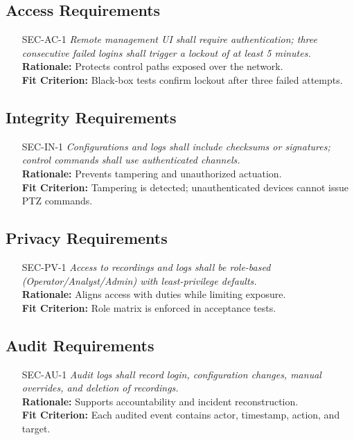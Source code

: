 \documentclass[12pt]{article}
\begin{document}
\subsection{Access Requirements}
\begin{itemize}[leftmargin=*]
  \item[SEC-AC-1] \emph{Remote management UI shall require authentication; three
          consecutive failed logins shall trigger a lockout of at least 5 minutes.}\\
        \textbf{Rationale:} Protects control paths exposed over the network.\\
        \textbf{Fit Criterion:} Black-box tests confirm lockout after three failed
        attempts.
\end{itemize}

\subsection{Integrity Requirements}
\begin{itemize}[leftmargin=*]
  \item[SEC-IN-1] \emph{Configurations and logs shall include checksums or signatures;
          control commands shall use authenticated channels.}\\ \textbf{Rationale:}
        Prevents tampering and unauthorized actuation.\\ \textbf{Fit Criterion:}
        Tampering is detected; unauthenticated devices cannot issue PTZ commands.
\end{itemize}

\subsection{Privacy Requirements}
\begin{itemize}[leftmargin=*]
  \item[SEC-PV-1] \emph{Access to recordings and logs shall be role-based
          (Operator/Analyst/Admin) with least-privilege defaults.}\\ \textbf{Rationale:}
        Aligns access with duties while limiting exposure.\\ \textbf{Fit Criterion:}
        Role matrix is enforced in acceptance tests.
\end{itemize}

\subsection{Audit Requirements}
\begin{itemize}[leftmargin=*]
  \item[SEC-AU-1] \emph{Audit logs shall record login, configuration changes, manual
          overrides, and deletion of recordings.}\\ \textbf{Rationale:} Supports
        accountability and incident reconstruction.\\ \textbf{Fit Criterion:} Each
        audited event contains actor, timestamp, action, and target.
\end{itemize}
\end{document}
